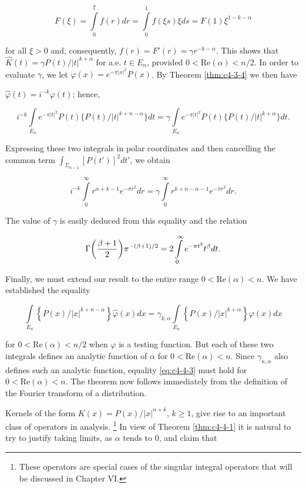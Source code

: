 \[
F(\xi)=\int\limits_{0}^{\xi}f(r)d r=\int\limits_{0}^{1}f(\xi s)\xi d s=F(1)\xi^{1-k-\alpha}
\]

for all $\xi > 0$ and, consequently, $f(r) = F'(r) = \gamma r^{-k-\alpha}$. This shows that $\hat{K}(t) = \gamma P(t)/|t|^{k+\alpha}$ for a.e. $t \in E_n$, provided $0 < \text{Re}(\alpha) < n/2$. In order to evaluate $\gamma$, we let $\varphi(x) = e^{-\pi|x|^2}P(x)$. By Theorem \ref{thm:c4-3-4} we then have

$\hat{\varphi}(t) = i^{-k}\varphi(t)$; hence,

\[
i^{-k}\int\limits_{E_{n}}e^{-\pi|t|^{2}}P(t)\{P(t)/|t|^{k+n-\alpha}\}d t=\gamma\int\limits_{E_{n}}e^{-\pi|t|^{2}}P(t)\{P(t)/|t|^{k+\alpha}\}d t.
\]

Expressing these two integrals in polar coordinates and then cancelling the common term $\int_{\Sigma_{n-1}} [P(t')]^2 dt'$, we obtain

\[
i^{-k}\int\limits_{0}^{\infty}r^{\alpha+k-1}e^{-\pi r^{2}}d r=\gamma\int\limits_{0}^{\infty}r^{k+n-\alpha-1}e^{-\pi r^{2}}d r.
\]

The value of $\gamma$ is easily deduced from this equality and the relation

\[
\Gamma\biggl(\frac{\beta+1}{2}\biggr)\pi^{-(\beta+1)/2}=2\intop_{0}^{\infty}e^{-\pi t^{2}}t^{\beta}d t.
\]

Finally, we must extend our result to the entire range $0 < \text{Re}(\alpha) < n$. We have established the equality

\begin{equation}\label{eq:c4-4-3}
\int\limits_{E_{n}}\left\{P(x)/|x|^{k+n-\alpha}\right\}\hat{\varphi}(x)d x=\gamma_{k,\alpha}\int\limits_{E_{n}}\left\{P(x)/|x|^{k+\alpha}\right\}\varphi(x)d x
\end{equation}

for $0 < \text{Re}(\alpha) < n/2$ when $\varphi$ is a testing function. But each of these two integrals defines an analytic function of $\alpha$ for $0 < \text{Re}(\alpha) < n$. Since $\gamma_{\kappa,\alpha}$ also defines such an analytic function, equality \eqref{eq:c4-4-3} must hold for $0 < \text{Re}(\alpha) < n$. The theorem now follows immediately from the definition of the Fourier transform of a distribution.

Kernels of the form $K(x) = P(x)/|x|^{n+k}$, $k \geq 1$, give rise to an important class of operators in analysis. \footnote{These operators are special cases of the singular integral operators that will be discussed in Chapter VI.} In view of Theorem \ref{thm:c4-4-1} it is natural to try to justify taking limits, as $\alpha$ tends to 0, and claim that

